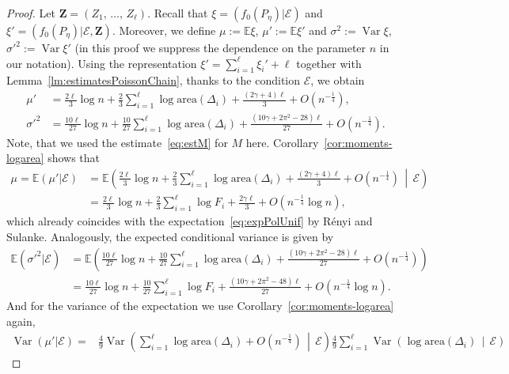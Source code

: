 \documentclass[AHL,Unicode,longabstracts,published]{cedram}
\newcommand{\var}{\operatorname{Var}}
\newcommand{\bfZ}{\mathbf{Z}}
\newcommand{\bbE}{\mathbb{E}}
\newcommand{\clE}{\mathcal{E}}
\newcommand{\area}{\mathrm{area}}
\begin{document}
\begin{proof}
Let ${\bfZ}=(Z_1,\,\dots,\,Z_\ell)$. Recall that $\xi=(f_0(P_{\eta})|\clE)$ and $\xi'=(f_0(P_{\eta})|\clE, {\bfZ})$. Moreover, we define $\mu:=\bbE\xi$, $\mu':=\bbE\xi'$ and $\sigma^2:=\var \xi$, ${\sigma'}^2:=\var \xi' $ (in this proof we suppress the dependence on the parameter $n$ in our notation). Using the representation $\xi'=\sum_{i=1}^\ell \xi_i'+\ell $ together with Lemma~\ref{lm:estimatesPoissonChain}, thanks to the condition $\clE$, we obtain
\begin{align*}
\mu' &= \frac{2 \ell}{3}\log n +\frac{2}{3}\sum_{i=1}^\ell \log{\area}(\Delta_i)+\frac{(2 \gamma + 4)\ell }3 + O\left(n^{-\frac 14}\right),\qquad
\\
\sigma'^2 &= \frac{10 \ell}{27}\log n +\frac{10}{27}\sum_{i=1}^\ell \log{\area}(\Delta_i) +
\frac{\left(10 \gamma + 2\pi^2 - 28\right)\ell }{27} + O\left(n^{-\frac 14}\right).
\end{align*}
Note, that we used the estimate~\eqref{eq:estM} for $M$ here. Corollary~\ref{cor:moments-logarea} shows that
\begin{align*}
\mu =
\bbE (\mu' | \clE) &=
\bbE \left(\frac{2 \ell}{3}\log n +\frac{2}{3}\sum_{i=1}^\ell \log{\area}(\Delta_i)+\frac{(2 \gamma + 4)\ell }3 + O(n^{-\frac 14}) \, \middle|\,\clE \right)
\\ &= \frac{2 \ell}{3}\log n + \frac 23 \sum_{i=1}^\ell \log F_i + \frac{2 \gamma \ell }3 + O\left(n^{- \frac 14} \log n\right),
\end{align*}
which already coincides with the expectation~\eqref{eq:expPolUnif} by Rényi and Sulanke. Analogously, the expected conditional variance is given by
\begin{align*}
\bbE ({\sigma'}^2 | \clE) &=
\bbE \left(\frac{10 \ell}{27}\log n +\frac{10}{27}\sum_{i=1}^\ell \log{\area}(\Delta_i) +
\frac{\left(10 \gamma + 2\pi^2 - 28\right)\ell }{27} + O\left(n^{-\frac 14}\right) \right)
\\ &= \frac{10 \ell}{27}\log n +\frac{10}{27}\sum_{i=1}^\ell \log F_i +
\frac{\left(10 \gamma + 2\pi^2 - 48\right)\ell }{27} + O\left(n^{-\frac 14} \log n\right).
\end{align*}
And for the variance of the expectation we use Corollary~\ref{cor:moments-logarea} again,
\begin{align*}
\var (\mu' | \clE) = &
\frac 49 \var \left(\sum_{i=1}^\ell \log {\area} (\Delta_i) +O(n^{-\frac 14})\, \middle|\,\clE \right)
\frac 49 \sum_{i=1}^\ell \var \left(\log {\area} (\Delta_i) \, \middle|\,\clE \right)

\end{align*}
\end{proof}
\end{document}
